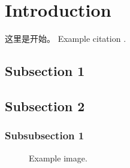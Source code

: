\documentclass[12pt,a4paper]{article} %
\begin{document}

\tableofcontents %

\newpage %


\section{Introduction} %

这里是开始。 Example citation \cite{Figueredo:2009dg}.


\subsection{Subsection 1} %

\lipsum[1] %


\subsection{Subsection 2} %

\lipsum[2] %


\subsubsection{Subsubsection 1} %

\lipsum[3] %

\begin{figure}[h] %
\caption{Example image.}
\label{fig:speciation}
\end{figure}
\end{document}
